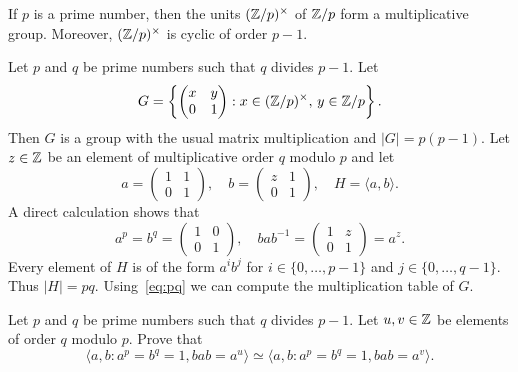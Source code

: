 
\label{Frobenius}

If $p$ is a prime number, then
the units $(\mathbb{Z}/p)^{\times}$ 
of $\mathbb{Z}/p$ form a multiplicative group. Moreover, 
$(\mathbb{Z}/p)^{\times}$ 
is cyclic of order $p-1$. 

Let $p$ and $q$ be prime numbers such that $q$ divides $p-1$. Let 
\[
G=\left\{\begin{pmatrix}
x & y\\
0 & 1
\end{pmatrix}
:x\in(\mathbb{Z}/p)^\times,\,y\in\mathbb{Z}/p\right\}.
\]
Then $G$ is a group with the usual matrix multiplication
and $|G|=p(p-1)$. Let $z\in\mathbb{Z}$ be an element of multiplicative order $q$ modulo $p$ 
and let 
\[
a=\begin{pmatrix}
1&1\\
0&1
\end{pmatrix},
\quad
b=\begin{pmatrix}
z&1\\
0&1
\end{pmatrix},
\quad
H=\langle a,b\rangle.
\]
A direct calculation shows that 
\begin{equation}
\label{eq:pq}
a^p=b^q=\begin{pmatrix}
1&0\\
0&1
\end{pmatrix},
\quad
bab^{-1}=\begin{pmatrix}
1&z\\
0&1
\end{pmatrix}
=a^z.
\end{equation}
Every element of $H$ is of the form $a^ib^j$ for $i\in\{0,\dots,p-1\}$ and  $j\in\{0,\dots,q-1\}$. 
Thus $|H|=pq$. Using~\eqref{eq:pq} we can compute 
the multiplication table of $G$. 

\begin{exercise}
    Let $p$ and $q$ be prime numbers such that $q$ divides $p-1$. Let
    $u,v\in\mathbb{Z}$ be elements of order $q$ modulo $p$. 
    Prove that 
    \[
    \langle a,b:a^p=b^q=1,bab=a^u\rangle
    \simeq \langle a,b:a^p=b^q=1,bab=a^v\rangle.
    \]
\end{exercise}

